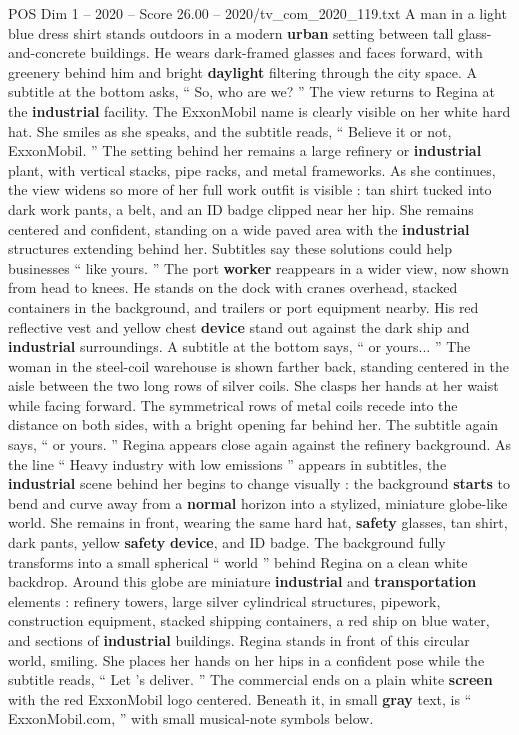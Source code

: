 \begin{textsample}{POS Dim 1 – 2020 – Score 26.00 – 2020/tv\_com\_2020\_119.txt}
A man in a light blue dress shirt stands outdoors in a modern \textbf{urban} setting between tall glass-and-concrete buildings.
He wears dark-framed glasses and faces forward, with greenery behind him and bright \textbf{daylight} filtering through the city space.
A subtitle at the bottom asks, “ So, who are we? ” The view returns to Regina at the \textbf{industrial} facility.
The ExxonMobil name is clearly visible on her white hard hat.
She smiles as she speaks, and the subtitle reads, “ Believe it or not, ExxonMobil. ” The setting behind her remains a large refinery or \textbf{industrial} plant, with vertical stacks, pipe racks, and metal frameworks.
As she continues, the view widens so more of her full work outfit is visible : tan shirt tucked into dark work pants, a belt, and an ID badge clipped near her hip.
She remains centered and confident, standing on a wide paved area with the \textbf{industrial} structures extending behind her.
Subtitles say these solutions could help businesses “ like yours. ” The port \textbf{worker} reappears in a wider view, now shown from head to knees.
He stands on the dock with cranes overhead, stacked containers in the background, and trailers or port equipment nearby.
His red reflective vest and yellow chest \textbf{device} stand out against the dark ship and \textbf{industrial} surroundings.
A subtitle at the bottom says, “ or yours... ” The woman in the steel-coil warehouse is shown farther back, standing centered in the aisle between the two long rows of silver coils.
She clasps her hands at her waist while facing forward.
The symmetrical rows of metal coils recede into the distance on both sides, with a bright opening far behind her.
The subtitle again says, “ or yours. ” Regina appears close again against the refinery background.
As the line “ Heavy industry with low emissions ” appears in subtitles, the \textbf{industrial} scene behind her begins to change visually : the background \textbf{starts} to bend and curve away from a \textbf{normal} horizon into a stylized, miniature globe-like world.
She remains in front, wearing the same hard hat, \textbf{safety} glasses, tan shirt, dark pants, yellow \textbf{safety} \textbf{device}, and ID badge.
The background fully transforms into a small spherical “ world ” behind Regina on a clean white backdrop.
Around this globe are miniature \textbf{industrial} and \textbf{transportation} elements : refinery towers, large silver cylindrical structures, pipework, construction equipment, stacked shipping containers, a red ship on blue water, and sections of \textbf{industrial} buildings.
Regina stands in front of this circular world, smiling.
She places her hands on her hips in a confident pose while the subtitle reads, “ Let ’s deliver. ” The commercial ends on a plain white \textbf{screen} with the red ExxonMobil logo centered.
Beneath it, in small \textbf{gray} text, is “ ExxonMobil.com, ” with small musical-note symbols below.

\end{textsample}
